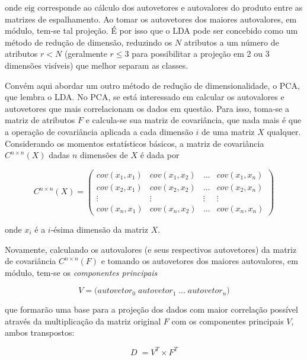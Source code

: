 \noindent onde $\mathrm{eig}$ corresponde ao cálculo dos autovetores e
autovalores do produto entre as matrizes de espalhamento. Ao tomar os
autovetores dos maiores autovalores, em módulo, tem-se tal projeção. É por isso
que o LDA pode ser concebido como um método de redução de dimensão, reduzindo os
$N$ atributos a um número de atributos $r < N$ (geralmente $r \le 3$ para
possibilitar a projeção em 2 ou 3 dimensões visíveis) que melhor separam as
classes.

Convém aqui abordar um outro método de redução de dimensionalidade, o PCA, que
lembra o LDA. No PCA, se está interessado em calcular os autovalores e
autovetores que mais correlacionam os dados em questão. Para isso, toma-se a
matriz de atributos $F$ e calcula-se sua matriz de covariância, que nada mais é
que a operação de covariância aplicada a cada dimensão $i$ de uma matriz $X$
qualquer. Considerando os momentos estatísticos básicos, a matriz de covariância
$C^{n \times n}(X)$ dadas $n$ dimensões de $X$ é dada por

\begin{equation}
  C^{n \times n}(X) = \left(
    \begin{array}{cccc}
      cov(x_1,x_1) & cov(x_1,x_2) & \dots  & cov(x_1,x_n) \\
      cov(x_2,x_1) & cov(x_2,x_2) & \dots  & cov(x_2,x_n) \\
      \vdots       & \vdots       & \vdots & \vdots       \\
      cov(x_n,x_1) & cov(x_n,x_2) & \dots  & cov(x_n,x_n)
    \end{array}
  \right)
\end{equation}

\noindent onde $x_i$ é a $i$-ésima dimensão da matriz $X$.

Novamente, calculando os autovalores (e seus respectivos autovetores) da matriz
de covariância $C^{n \times n}(F)$ e tomando os autovetores dos maiores
autovalores, em módulo, tem-se os \emph{componentes principais}

\begin{equation}
 V = \bigg(autovetor_0 \; autovetor_1 \; \dots \; autovetor_n \bigg)
\end{equation}

\noindent que formarão uma base para a projeção dos dados com maior correlação
possível através da multiplicação da matriz original $F$ com os componentes
principais $V$, ambos transpostos:

\begin{equation}
 D \; = V^T \times F^T
\end{equation}

